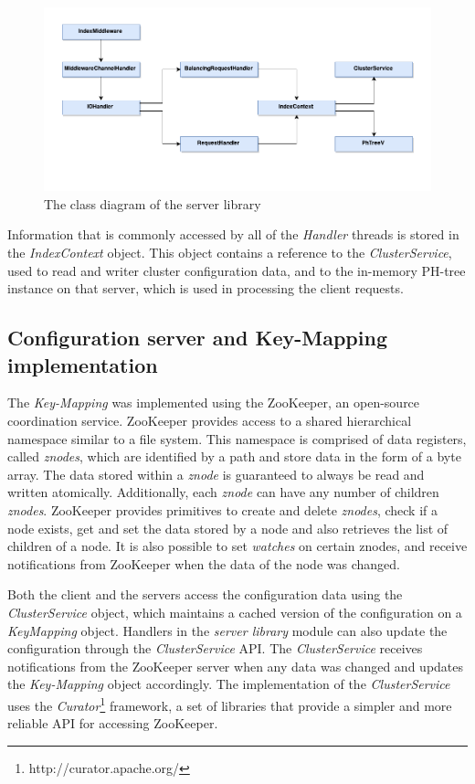 \documentclass[11pt,a4paper]{globis-book}
\begin{document}
\begin{figure}[h]
    \centering 
    \includegraphics[scale=1]{images/Server}
    \caption{The class diagram of the server library}
    \label{fig:Server-library}
\end{figure}

Information that is commonly accessed by all of the \textit{Handler} threads is stored in the \textit{IndexContext} object. This object contains a reference to the \textit{ClusterService}, used to read and writer cluster configuration data, and to the in-memory PH-tree instance on that server, which is used in processing the client requests. 

\subsection{Configuration server and Key-Mapping implementation}

The \textit{Key-Mapping} was implemented using the ZooKeeper, an open-source coordination service. ZooKeeper provides access to a shared hierarchical namespace similar to a file system. This namespace is comprised of data registers, called \textit{znodes}, which are identified by a path and store data in the form of a byte array. The data stored within a \textit{znode} is guaranteed to always be read and written atomically. Additionally, each \textit{znode} can have any number of children \textit{znodes}. ZooKeeper provides primitives to create and delete \textit{znodes}, check if a node exists, get and set the data stored by a node and also retrieves the list of children of a node. It is also possible to set \textit{watches} on certain znodes, and receive notifications from ZooKeeper when the data of the node was changed. 

Both the client and the servers access the configuration data using the \textit{ClusterService} object, which maintains a cached version of the configuration on a \textit{KeyMapping} object. Handlers in the \textit{server library} module can also update the configuration through the \textit{ClusterService} API. The \textit{ClusterService} receives notifications from the ZooKeeper server when any data was changed and updates the \textit{Key-Mapping} object accordingly. The implementation of the \textit{ClusterService} uses the \textit{Curator}\footnote{http://curator.apache.org/} framework, a set of libraries that provide a simpler and more reliable API for accessing ZooKeeper. 
\end{document}
